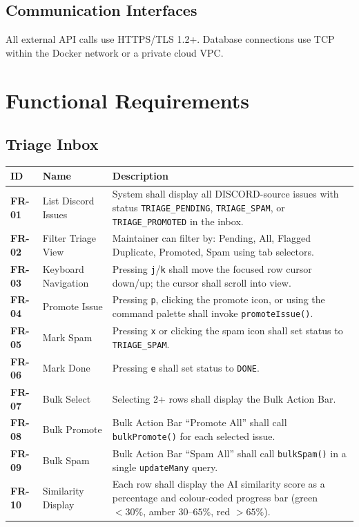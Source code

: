 \documentclass[12pt,a4paper]{report}
\begin{document}
\subsection{Communication Interfaces}
All external API calls use HTTPS/TLS 1.2+.  Database connections use TCP
within the Docker network or a private cloud VPC.

\section{Functional Requirements}

\subsection{Triage Inbox}

\begin{longtable}{>{\bfseries}p{1.8cm} p{4.5cm} p{6.5cm}}
\toprule
ID & Name & Description \\
\midrule
\endhead
FR-01 & List Discord Issues & System shall display all DISCORD-source issues with
  status \texttt{TRIAGE\_PENDING}, \texttt{TRIAGE\_SPAM}, or
  \texttt{TRIAGE\_PROMOTED} in the inbox. \\
FR-02 & Filter Triage View & Maintainer can filter by: Pending, All, Flagged
  Duplicate, Promoted, Spam using tab selectors. \\
FR-03 & Keyboard Navigation & Pressing \texttt{j}/\texttt{k} shall move the
  focused row cursor down/up; the cursor shall scroll into view. \\
FR-04 & Promote Issue & Pressing \texttt{p}, clicking the promote icon, or using
  the command palette shall invoke \texttt{promoteIssue()}. \\
FR-05 & Mark Spam & Pressing \texttt{x} or clicking the spam icon shall set
  status to \texttt{TRIAGE\_SPAM}. \\
FR-06 & Mark Done & Pressing \texttt{e} shall set status to \texttt{DONE}. \\
FR-07 & Bulk Select & Selecting 2+ rows shall display the Bulk Action Bar. \\
FR-08 & Bulk Promote & Bulk Action Bar ``Promote All'' shall call
  \texttt{bulkPromote()} for each selected issue. \\
FR-09 & Bulk Spam & Bulk Action Bar ``Spam All'' shall call
  \texttt{bulkSpam()} in a single \texttt{updateMany} query. \\
FR-10 & Similarity Display & Each row shall display the AI similarity score as
  a percentage and colour-coded progress bar (green $<30\%$, amber
  $30\text{--}65\%$, red $>65\%$). \\
\bottomrule
\end{longtable}
\end{document}
